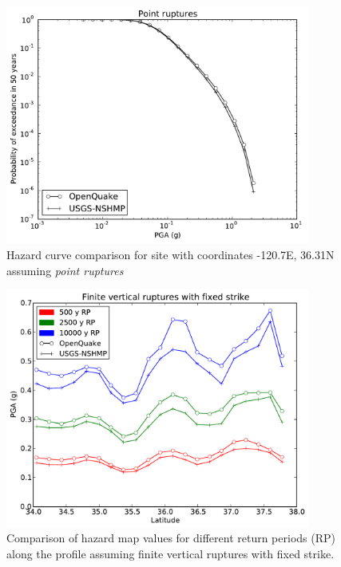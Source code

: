 \begin{figure}
\centering
\includegraphics[width=10cm]{./qareport/pictures/-120pt7_36pt31_point.pdf}
\caption{Hazard curve comparison for site with coordinates -120.7E, 36.31N assuming \textit{point ruptures}}
\label{fig:cal_grid_curve_point}
\end{figure}

\begin{figure}
\centering
\includegraphics[width=10cm]{./qareport/pictures/gridded_seismicity_oq_nshmp_fixedstrikevertical.pdf}
\caption{Comparison of hazard map values for different return periods (RP) along the profile assuming finite vertical ruptures with fixed strike.}
\label{fig:cal_grid_map_finite}
\end{figure}

